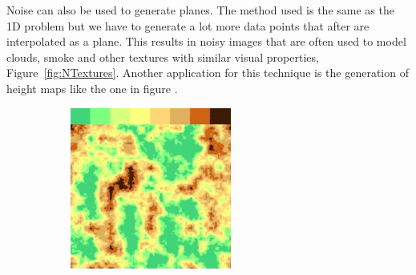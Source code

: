 Noise can also be used to generate planes. The method used is the same as the 1D problem but we have to generate a lot more data points that after are interpolated as a plane. This results in noisy images that are often used to model clouds, smoke and other textures with similar visual properties, Figure~\ref{fig:NTextures}. Another application for this technique is the generation of height maps like the one in figure .



\begin{figure}
        \centering
        \begin{subfigure}[b]{0.3\textwidth}
                \includegraphics[width=\textwidth]{img/Theory/Perlin_Noise/gradient_discrete.png}
                \label{fig:Fleaf}
        \end{subfigure}%
        ~ %
        \begin{subfigure}[b]{0.3\textwidth}

\end{subfigure}
\end{figure}
